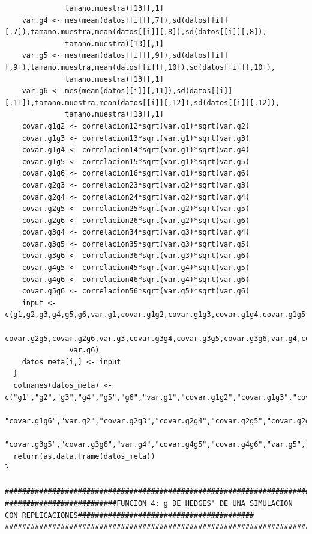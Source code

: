 \documentclass[a4paper,openright,12pt]{report}
\begin{document}
{\begin{verbatim}
              tamano.muestra)[13][,1]
    var.g4 <- mes(mean(datos[[i]][,7]),sd(datos[[i]][,7]),tamano.muestra,mean(datos[[i]][,8]),sd(datos[[i]][,8]),
              tamano.muestra)[13][,1]
    var.g5 <- mes(mean(datos[[i]][,9]),sd(datos[[i]][,9]),tamano.muestra,mean(datos[[i]][,10]),sd(datos[[i]][,10]),
              tamano.muestra)[13][,1]
    var.g6 <- mes(mean(datos[[i]][,11]),sd(datos[[i]][,11]),tamano.muestra,mean(datos[[i]][,12]),sd(datos[[i]][,12]),
              tamano.muestra)[13][,1]
    covar.g1g2 <- correlacion12*sqrt(var.g1)*sqrt(var.g2)
    covar.g1g3 <- correlacion13*sqrt(var.g1)*sqrt(var.g3)
    covar.g1g4 <- correlacion14*sqrt(var.g1)*sqrt(var.g4)
    covar.g1g5 <- correlacion15*sqrt(var.g1)*sqrt(var.g5)
    covar.g1g6 <- correlacion16*sqrt(var.g1)*sqrt(var.g6)
    covar.g2g3 <- correlacion23*sqrt(var.g2)*sqrt(var.g3)
    covar.g2g4 <- correlacion24*sqrt(var.g2)*sqrt(var.g4)
    covar.g2g5 <- correlacion25*sqrt(var.g2)*sqrt(var.g5)
    covar.g2g6 <- correlacion26*sqrt(var.g2)*sqrt(var.g6)
    covar.g3g4 <- correlacion34*sqrt(var.g3)*sqrt(var.g4)
    covar.g3g5 <- correlacion35*sqrt(var.g3)*sqrt(var.g5)
    covar.g3g6 <- correlacion36*sqrt(var.g3)*sqrt(var.g6)
    covar.g4g5 <- correlacion45*sqrt(var.g4)*sqrt(var.g5)
    covar.g4g6 <- correlacion46*sqrt(var.g4)*sqrt(var.g6)
    covar.g5g6 <- correlacion56*sqrt(var.g5)*sqrt(var.g6)
    input <- c(g1,g2,g3,g4,g5,g6,var.g1,covar.g1g2,covar.g1g3,covar.g1g4,covar.g1g5,covar.g1g6,var.g2,covar.g2g3,covar.g2g4,
               covar.g2g5,covar.g2g6,var.g3,covar.g3g4,covar.g3g5,covar.g3g6,var.g4,covar.g4g5,covar.g4g6,var.g5,covar.g5g6,
               var.g6)
    datos_meta[i,] <- input
  }
  colnames(datos_meta) <- c("g1","g2","g3","g4","g5","g6","var.g1","covar.g1g2","covar.g1g3","covar.g1g4","covar.g1g5",
                            "covar.g1g6","var.g2","covar.g2g3","covar.g2g4","covar.g2g5","covar.g2g6","var.g3","covar.g3g4",
                            "covar.g3g5","covar.g3g6","var.g4","covar.g4g5","covar.g4g6","var.g5","covar.g5g6","var.g6")
  return(as.data.frame(datos_meta))
}

##############################################################################################################################
##########################FUNCION 4: g DE HEDGES' DE UNA SIMULACION CON REPLICACIONES#########################################
##############################################################################################################################


\end{verbatim}}
\end{document}
